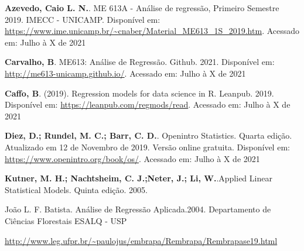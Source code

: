 \documentclass[
]{article}
\begin{document}
\textbf{Azevedo, Caio L. N.}. ME 613A - Análise de regressão, Primeiro
Semestre 2019. IMECC - UNICAMP. Disponível em:
\url{https://www.ime.unicamp.br/~cnaber/Material_ME613_1S_2019.htm}.
Acessado em: Julho à X de 2021

\textbf{Carvalho, B}. ME613: Análise de Regressão. Github. 2021.
Disponível em: \url{http://me613-unicamp.github.io/}. Acessado em: Julho
à X de 2021

\textbf{Caffo, B}. (2019). Regression models for data science in R.
Leanpub. 2019. Disponível em: \url{https://leanpub.com/regmods/read}.
Acessado em: Julho à X de 2021

\textbf{Diez, D.; Rundel, M. C.; Barr, C. D.}. Openintro Statistics.
Quarta edição. Atualizado em 12 de Novembro de 2019. Versão online
gratuita. Disponível em: \url{https://www.openintro.org/book/os/}.
Acessado em: Julho à X de 2021

\textbf{Kutner, M. H.; Nachtsheim, C. J.;Neter, J.; Li, W.}.Applied
Linear Statistical Models. Quinta edição. 2005.

João L. F. Batista. Análise de Regressão Aplicada.2004. Departamento de
Ciências Florestais ESALQ - USP

\url{http://www.leg.ufpr.br/~paulojus/embrapa/Rembrapa/Rembrapase19.html}
\end{document}
